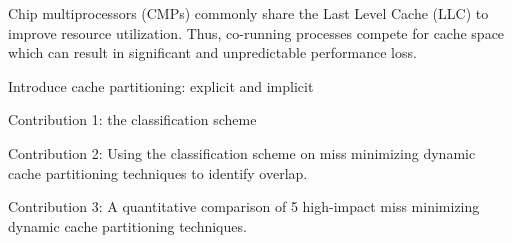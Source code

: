 Chip multiprocessors (CMPs) commonly share the Last Level Cache (LLC) to improve resource utilization.
Thus, co-running processes compete for cache space which can result in significant and unpredictable performance loss.

Introduce cache partitioning: explicit and implicit

Contribution 1:  the classification scheme

Contribution 2: Using the classification scheme on miss minimizing dynamic cache partitioning techniques to identify overlap.

Contribution 3: A quantitative comparison of 5 high-impact miss minimizing dynamic cache partitioning techniques.